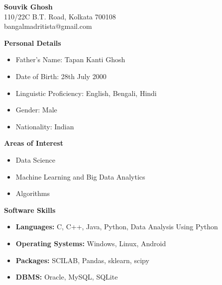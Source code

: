 \documentclass[a4paper,10pt]{article}
\begin{document}
\begin{center}
{\Large \textbf{Souvik Ghosh}} \\
\vspace{0.2cm}
110/22C B.T. Road, Kolkata 700108 \\
bangalmadritista@gmail.com \\
\href{https://www.linkedin.com/in/souvik-ghosh-78aaab232}{\faLinkedin} \hspace{1cm} \href{https://github.com/Souvik-prog}{\faGithub}
\end{center}

\vspace{0.5cm}

\textbf{Personal Details} \\
\begin{itemize}
    \item Father's Name: Tapan Kanti Ghosh
    \item Date of Birth: 28th July 2000
    \item Linguistic Proficiency: English, Bengali, Hindi
    \item Gender: Male
    \item Nationality: Indian
\end{itemize}

\vspace{0.5cm}

\textbf{Areas of Interest} \\
\begin{itemize}
    \item Data Science
    \item Machine Learning and Big Data Analytics
    \item Algorithms
\end{itemize}

\vspace{0.5cm}

\textbf{Software Skills} \\
\begin{itemize}
    \item \textbf{Languages:} C, C++, Java, Python, Data Analysis Using Python
    \item \textbf{Operating Systems:} Windows, Linux, Android
    \item \textbf{Packages:} SCILAB, Pandas, sklearn, scipy
    \item \textbf{DBMS:} Oracle, MySQL, SQLite
\end{itemize}

\vspace{0.5cm}
\end{document}
